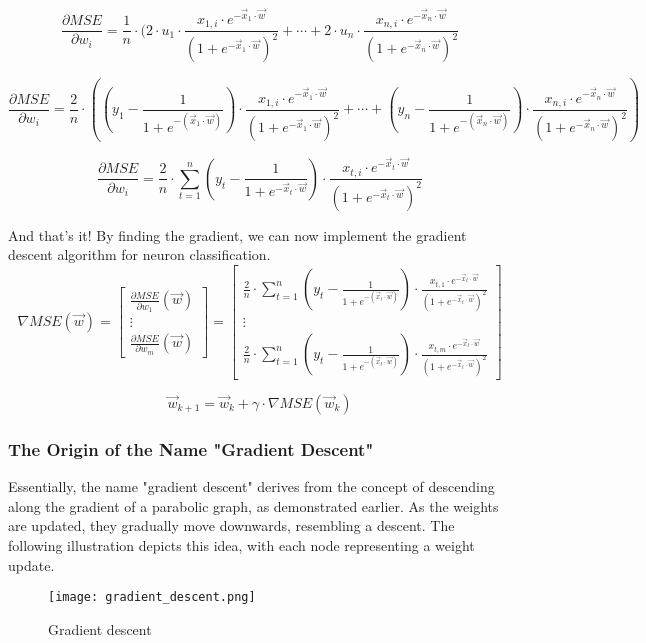 \[
\frac{\partial MSE}{\partial w_i} = \frac{1}{n} \cdot (2 \cdot u_1 \cdot
\frac{x_{1, i} \cdot e^{- \vec{x}_1 \cdot \vec{w}}}{(1 + e^{- \vec{x}_1 \cdot \vec{w}})^2}
+ \cdots +
2 \cdot u_n \cdot
\frac{x_{n, i} \cdot e^{- \vec{x}_n \cdot \vec{w}}}{(1 + e^{- \vec{x}_n \cdot \vec{w}})^2}
\]

\[
\frac{\partial MSE}{\partial w_i} = \frac{2}{n} \cdot (
(y_1 - \frac{1}{1 + e^{-(\vec{x}_1 \cdot \vec{w})}}) \cdot
\frac{x_{1, i} \cdot e^{- \vec{x}_1 \cdot \vec{w}}}{(1 + e^{- \vec{x}_1 \cdot \vec{w}})^2}
+ \cdots +
(y_n - \frac{1}{1 + e^{-(\vec{x}_n \cdot \vec{w})}}) \cdot
\frac{x_{n, i} \cdot e^{- \vec{x}_n \cdot \vec{w}}}{(1 + e^{- \vec{x}_n \cdot \vec{w}})^2}
)
\]


\[
\frac{\partial MSE}{\partial w_i} = \frac{2}{n} \cdot \sum_{t = 1}^n
(y_t - \frac{1}{1 + e^{-\vec{x}_t \cdot \vec{w}}}) \cdot
\frac{x_{t, i} \cdot e^{- \vec{x}_t \cdot \vec{w}}}{(1 + e^{- \vec{x}_t \cdot \vec{w}})^2}
\]

And that's it! By finding the gradient, we can now implement the gradient descent algorithm
for neuron classification.
\[
\nabla MSE(\vec{w}) =
\begin{bmatrix} \frac{\partial MSE}{\partial w_1}(\vec{w})
  \\ \vdots
  \\ \frac{\partial MSE}{\partial w_m}(\vec{w})
\end{bmatrix} =
\begin{bmatrix} \frac{2}{n} \cdot \sum_{t = 1}^n
  (y_t - \frac{1}{1 + e^{-(\vec{x}_t \cdot \vec{w})}}) \cdot
  \frac{x_{t, 1} \cdot e^{- \vec{x}_t \cdot \vec{w}}}{(1 + e^{- \vec{x}_t \cdot \vec{w}})^2}
  \\ \vdots
  \\ \frac{2}{n} \cdot \sum_{t = 1}^n  (y_t - \frac{1}{1 + e^{-(\vec{x}_t \cdot \vec{w})}}) \cdot
  \frac{x_{t, m} \cdot e^{- \vec{x}_t \cdot \vec{w}}}{(1 + e^{- \vec{x}_t \cdot \vec{w}})^2}
\end{bmatrix}
\]

\[
\vec{w}_{k + 1} = \vec{w}_{k} + \gamma \cdot \nabla MSE(\vec{w}_k)
\]

\subsubsection{The Origin of the Name "Gradient Descent"}
Essentially, the name "gradient descent" derives from the concept of descending along the gradient of a
parabolic graph, as demonstrated earlier. As the weights are updated, they gradually move downwards,
resembling a descent. The following illustration depicts this idea, with each node representing a weight update.
\begin{figure}[H]
  \centering
  \texttt{[image: gradient\_descent.png]}
  \caption{Gradient descent}
\end{figure}

